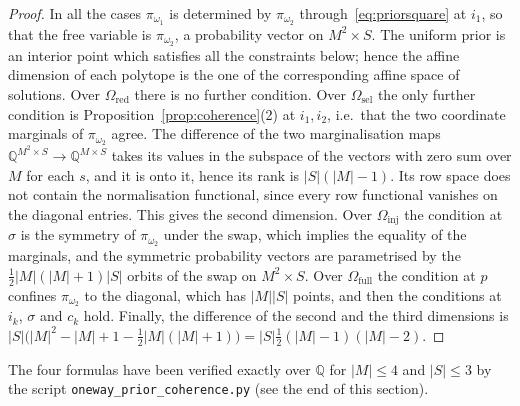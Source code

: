 \documentclass[11pt,a4paper]{article}
\theoremstyle{plain}
\theoremstyle{definition}
\theoremstyle{remark}
\newcommand{\cat}[1]{\mathsf{#1}}
\newcommand{\catO}{\cat{\Omega}}
\begin{document}
\begin{proof}
In all the cases $\pi_{\omega_1}$ is determined by $\pi_{\omega_2}$
through~\eqref{eq:priorsquare} at $i_1$, so that the free variable is
$\pi_{\omega_2}$, a probability vector on $M^{2}\times S$. The uniform prior is
an interior point which satisfies all the constraints below; hence the affine
dimension of each polytope is the one of the corresponding affine space of
solutions. Over $\catO_{\mathrm{red}}$ there is no further condition. Over
$\catO_{\mathrm{sel}}$ the only further condition is
Proposition~\ref{prop:coherence}(2) at $i_1,i_2$, i.e.\ that the two coordinate
marginals of $\pi_{\omega_2}$ agree. The difference of the two marginalisation
maps $\mathbb{Q}^{M^{2}\times S} \to \mathbb{Q}^{M\times S}$ takes its values
in the subspace of the vectors with zero sum over $M$ for each $s$, and it is
onto it, hence its rank is $|S|(|M|-1)$. Its row space does not contain the
normalisation functional, since every row functional vanishes on the diagonal
entries. This gives the second dimension. Over $\catO_{\mathrm{inj}}$ the
condition at $\sigma$ is the symmetry of $\pi_{\omega_2}$ under the swap,
which implies the equality of the marginals, and the symmetric probability
vectors are parametrised by the $\tfrac12|M|(|M|+1)|S|$ orbits of the swap on
$M^{2}\times S$. Over $\catO_{\mathrm{full}}$ the condition at $p$ confines
$\pi_{\omega_2}$ to the diagonal, which has $|M||S|$ points, and then the
conditions at $i_k$, $\sigma$ and $c_k$ hold. Finally, the difference of the
second and the third dimensions is
$|S|\bigl(|M|^{2}-|M|+1-\tfrac12|M|(|M|+1)\bigr) =
|S|\tfrac12(|M|-1)(|M|-2)$.
\end{proof}

The four formulas have been verified exactly over $\mathbb{Q}$ for $|M|\le 4$
and $|S|\le 3$ by the script
\texttt{oneway\_\allowbreak prior\_\allowbreak coherence.py} (see the end of
this section).
\end{document}

